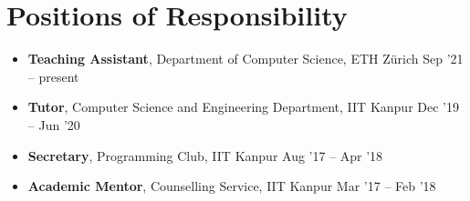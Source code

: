\newcommand{\por}[3]{\textbf{#1}, #2 \hfill #3}

\section*{Positions of Responsibility}
\begin{itemize}

\setlength\itemsep{0pt}
\item \por{Teaching Assistant}{Department of Computer Science, ETH Zürich}{Sep '21 -- present}%
\item \por{Tutor}{Computer Science and Engineering Department, IIT Kanpur}{Dec '19 -- Jun '20}%
\item \por{Secretary}{Programming Club, IIT Kanpur}{Aug '17 -- Apr '18}%
\item \por{Academic Mentor}{Counselling Service, IIT Kanpur}{Mar '17 -- Feb '18}%

\end{itemize}
